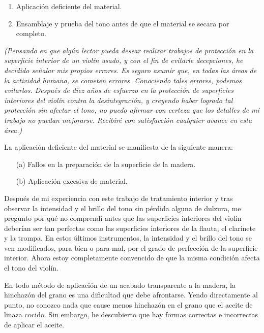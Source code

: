 \documentclass[12pt]{book}
\begin{document}
\begin{enumerate}
    \item Aplicación deficiente del material.
    \item Ensamblaje y prueba del tono antes de que el material se secara por completo.
\end{enumerate}

\textit{(Pensando en que algún lector pueda desear realizar trabajos de protección en la superficie interior de un violín usado, y con el fin de evitarle decepciones, he decidido señalar mis propios errores. Es seguro asumir que, en todas las áreas de la actividad humana, se cometen errores. Conociendo tales errores, podemos evitarlos. Después de diez años de esfuerzo en la protección de superficies interiores del violín contra la desintegración, y creyendo haber logrado tal protección sin afectar el tono, no puedo afirmar con certeza que los detalles de mi trabajo no puedan mejorarse. Recibiré con satisfacción cualquier avance en esta área.)}

La aplicación deficiente del material se manifiesta de la siguiente manera:
\begin{enumerate}
    \item[(a)] Fallos en la preparación de la superficie de la madera.
    \item[(b)] Aplicación excesiva de material.
\end{enumerate}

Después de mi experiencia con este trabajo de tratamiento interior y tras observar la intensidad y el brillo del tono sin pérdida alguna de dulzura, me pregunto por qué no comprendí antes que las superficies interiores del violín deberían ser tan perfectas como las superficies interiores de la flauta, el clarinete y la trompa. En estos últimos instrumentos, la intensidad y el brillo del tono se ven modificados, para bien o para mal, por el grado de perfección de la superficie interior. Ahora estoy completamente convencido de que la misma condición afecta el tono del violín.

En todo método de aplicación de un acabado transparente a la madera, la hinchazón del grano es una dificultad que debe afrontarse. Yendo directamente al punto, no conozco nada que cause menos hinchazón en el grano que el aceite de linaza cocido. Sin embargo, he descubierto que hay formas correctas e incorrectas de aplicar el aceite. 
\end{document}
